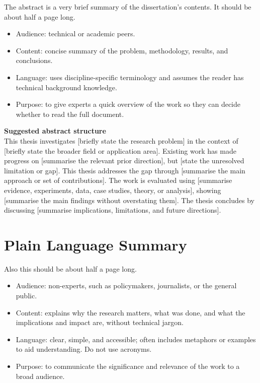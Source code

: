 
The abstract is a very brief summary of the dissertation's contents. It should be about half a page long. 

\begin{itemize}
\item Audience: technical or academic peers.
\item Content: concise summary of the problem, methodology, results, and conclusions.
\item Language: uses discipline-specific terminology and assumes the reader has technical background knowledge.
\item Purpose: to give experts a quick overview of the work so they can decide whether to read the full document.
\end{itemize}

\textbf{Suggested abstract structure}\\
This thesis investigates [briefly state the research problem] in the context of [briefly state the broader field or application area]. Existing work has made progress on [summarise the relevant prior direction], but [state the unresolved limitation or gap]. This thesis addresses the gap through [summarise the main approach or set of contributions]. The work is evaluated using [summarise evidence, experiments, data, case studies, theory, or analysis], showing [summarise the main findings without overstating them]. The thesis concludes by discussing [summarise implications, limitations, and future directions].


\cleardoublepage{}
{}\mtcaddchapter 
\chapter*{Plain Language Summary}
\addtocounter{counter}{-1}


Also this should be about half a page long.

\begin{itemize}
\item Audience: non-experts, such as policymakers, journalists, or the general public.
\item Content: explains why the research matters, what was done, and what the implications and impact are, without technical jargon.
\item Language: clear, simple, and accessible; often includes metaphors or examples to aid understanding. Do not use acronyms.
\item Purpose: to communicate the significance and relevance of the work to a broad audience.
\end{itemize}


